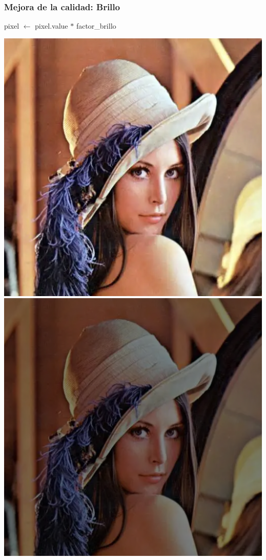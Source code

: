 \documentclass[
10pt, %
aspectratio=169, %
]{beamer}
\begin{document}
	\begin{frame}
		
		\frametitle{Mejora de la calidad: Brillo}
			
		\begin{algorithmic}
					\State pixel $\gets$ pixel.value $*$ factor\_brillo 
				\EndFor				
			\EndFunction
		\end{algorithmic}
		
		\centering
		\vspace{1\baselineskip}
		\includegraphics[scale=0.5]{lena.png} 
		\includegraphics[scale=0.25]{lena-con-brillo.png} 
		
	\end{frame}
	
\end{document}
